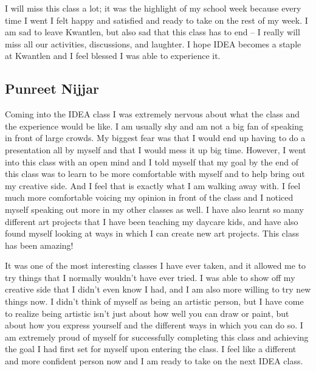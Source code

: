 \documentclass[letterpaper,10pt,headsepline]{scrreprt}
\begin{document}
I will miss this class a lot; it was the highlight of my school week because every time I went I felt happy and satisfied and ready to take on the rest of my week. I am sad to leave Kwantlen, but also sad that this class has to end -- I really will miss all our activities, discussions, and laughter. I hope IDEA becomes a staple at Kwantlen and I feel blessed I was able to experience it.

\subsection{Punreet Nijjar}

Coming into the IDEA class I was extremely nervous about what the class and the experience would be like. I am usually shy and am not a big fan of speaking in front of large crowds. My biggest fear was that I would end up having to do a presentation all by myself and that I would mess it up big time. However, I went into this class with an open mind and I told myself that my goal by the end of this class was to learn to be more comfortable with myself and to help bring out my creative side. And I feel that is exactly what I am walking away with. I feel much more comfortable voicing my opinion in front of the class and I noticed myself speaking out more in my other classes as well. I have also learnt so many different art projects that I have been teaching my daycare kids, and have also found myself looking at ways in which I can create new art projects. This class has been amazing!

It was one of the most interesting classes I have ever taken, and it allowed me to try things that I normally wouldn’t have ever tried. I was able to show off my creative side that I didn’t even know I had, and I am also more willing to try new things now. I didn’t think of myself as being an artistic person, but I have come to realize being artistic isn’t just about how well you can draw or paint, but about how you express yourself and the different ways in which you can do so. I am extremely proud of myself for successfully completing this class and achieving the goal I had first set for myself upon entering the class. I feel like a different and more confident person now and I am ready to take on the next IDEA class.
\end{document}
